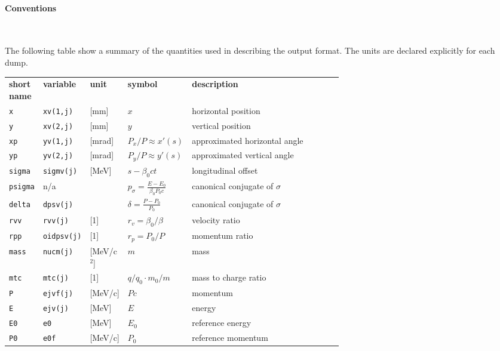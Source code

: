 \paragraph{Conventions}~

The following table show a summary of the quantities used in describing the output format. The units are declared explicitly for each dump. 

\bigskip
\begin{longtabu}{@{}llllp{0.65\linewidth}}
	\textbf{short name} & \textbf{variable} & \textbf{unit} &
	\textbf{symbol} & \textbf{description} \\
	\texttt{x} & \texttt{xv(1,j)} &[mm] & $x$& horizontal position\\
	\texttt{y} & \texttt{xv(2,j)} &[mm] & $y$& vertical position\\
	\texttt{xp} & \texttt{yv(1,j)} &[mrad] & $P_x/P\approx x'(s)$&  approximated horizontal angle\\
	\texttt{yp} & \texttt{yv(2,j)} &[mrad]& $P_y/P\approx y'(s)$&  approximated vertical angle\\
	\texttt{sigma} & \texttt{sigmv(j)} &[MeV] & $s-\beta_0 c t $& longitudinal offset \\
	\texttt{psigma} & n/a &  & $ p_\sigma=\frac{E-E_0}{\beta_0 P_0 c}$& canonical conjugate of $\sigma$ \\
	\texttt{delta} & \texttt{dpsv(j)} &  & $ \delta=\frac{P-P_0}{P_0}$& canonical conjugate of $\sigma$ \\
	\texttt{rvv}   & \texttt{rvv(j)} & [1]& $r_v=\beta_0/\beta$ &velocity ratio \\
	\texttt{rpp}   & \texttt{oidpsv(j)} & [1]& $r_p=P_0/P$ &momentum ratio \\
	\texttt{mass}  & \texttt{nucm(j)} & [MeV/c$^2$] & $m$ &mass \\
	\texttt{mtc}  & \texttt{mtc(j)} & [1] & $q/q_0 \cdot m_0/m $ & mass to charge ratio\\
	\texttt{P} & \texttt{ejvf(j)} &[MeV/c] & $Pc$& momentum \\
	\texttt{E} & \texttt{ejv(j)} &[MeV] & $E$& energy \\
	\texttt{E0} & \texttt{e0} &[MeV] & $E_0$& reference energy \\
	\texttt{P0} & \texttt{e0f} &[MeV/c] & $P_0$& reference momentum \\
\end{longtabu}


